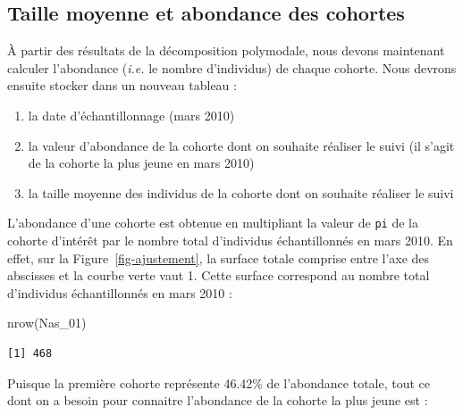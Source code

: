 \documentclass[
  french,
  a4paper,
  DIV=11,
  numbers=noendperiod,
  oneside]{scrreprt}
\newenvironment{Shaded}{}{}
\newcommand{\FunctionTok}[1]{\textcolor[rgb]{0.44,0.26,0.76}{#1}}
\newcommand{\NormalTok}[1]{\textcolor[rgb]{0.14,0.16,0.18}{#1}}
\providecommand{\tightlist}{%
  \setlength{\itemsep}{0pt}\setlength{\parskip}{0pt}}
\begin{document}
\begin{tcolorbox}
\section{Taille moyenne et abondance des
cohortes}\label{taille-moyenne-et-abondance-des-cohortes}

À partir des résultats de la décomposition polymodale, nous devons
maintenant calculer l'abondance (\emph{i.e.} le nombre d'individus) de
chaque cohorte. Nous devrons ensuite stocker dans un nouveau tableau :

\begin{enumerate}
\def\labelenumi{\arabic{enumi}.}
\tightlist
\item
  la date d'échantillonnage (mars 2010)
\item
  la valeur d'abondance de la cohorte dont on souhaite réaliser le suivi
  (il s'agit de la cohorte la plus jeune en mars 2010)
\item
  la taille moyenne des individus de la cohorte dont on souhaite
  réaliser le suivi\footnotemark{}
\end{enumerate}

L'abondance d'une cohorte est obtenue en multipliant la valeur de
\texttt{pi} de la cohorte d'intérêt par le nombre total d'individus
échantillonnés en mars 2010. En effet, sur la
Figure~\ref{fig-ajustement}, la surface totale comprise entre l'axe des
abscisses et la courbe verte vaut 1. Cette surface correspond au nombre
total d'individus échantillonnés en mars 2010 :

\begin{Shaded}
\begin{Highlighting}[]
\FunctionTok{nrow}\NormalTok{(Nas\_01)}
\end{Highlighting}
\end{Shaded}

\begin{verbatim}
[1] 468
\end{verbatim}


Puisque la première cohorte représente 46.42\% de l'abondance
totale\footnotemark{}, tout ce dont on a besoin pour connaitre
l'abondance de la cohorte la plus jeune est :

\begin{margintable}


\end{margintable}
\end{tcolorbox}
\end{document}
